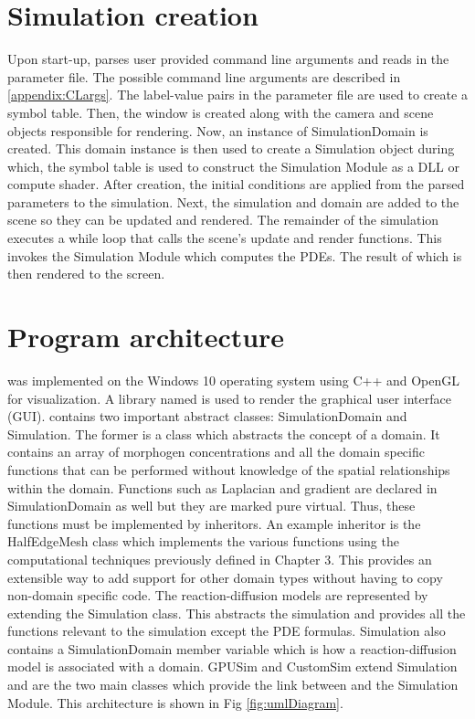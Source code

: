 \section{Simulation creation}
Upon start-up, \ProgramName{} parses user provided command line arguments and reads in the parameter file. The possible command line arguments are described in \ref{appendix:CLargs}. The label-value pairs in the parameter file are used to create a symbol table. Then, the window is created along with the camera and scene objects responsible for rendering. Now, an instance of SimulationDomain is created. This domain instance is then used to create a Simulation object during which, the symbol table is used to construct the Simulation Module as a DLL or compute shader. After creation, the initial conditions are applied from the parsed parameters to the simulation. Next, the simulation and domain are added to the scene so they can be updated and rendered. The remainder of the simulation executes a while loop that calls the scene's update and render functions. This invokes the Simulation Module which computes the PDEs. The result of which is then rendered to the screen.


\section{Program architecture} 
\ProgramName{} was implemented on the Windows 10 operating system using C++ and OpenGL for visualization. A library named  \citep{Cornut2019} is used to render the graphical user interface (GUI). \ProgramName{} contains two important abstract classes: SimulationDomain and Simulation. The former is a class which abstracts the concept of a domain. It contains an array of morphogen concentrations and all the domain specific functions that can be performed without knowledge of the spatial relationships within the domain. Functions such as Laplacian and gradient are declared in SimulationDomain as well but they are marked pure virtual. Thus, these functions must be implemented by inheritors. An example inheritor is the HalfEdgeMesh class which implements the various functions using the computational techniques previously defined in Chapter 3. This provides an extensible way to add support for other domain types without having to copy non-domain specific code. The reaction-diffusion models are represented by extending the Simulation class. This abstracts the simulation and provides all the functions relevant to the simulation except the PDE formulas. Simulation also contains a SimulationDomain member variable which is how a reaction-diffusion model is associated with a domain. GPUSim and CustomSim extend Simulation and are the two main classes which provide the link between \ProgramName{} and the Simulation Module. This architecture is shown in Fig \ref{fig:umlDiagram}.

